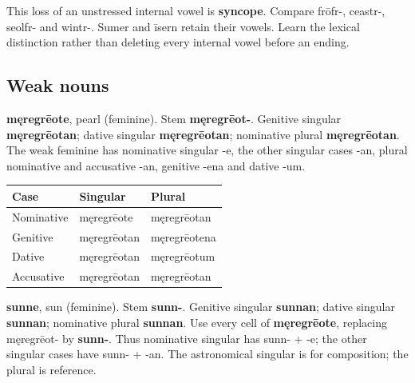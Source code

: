 This loss of an unstressed internal vowel is \textbf{syncope}. Compare frōfr-, ceastr-, seolfr- and wintr-. Sumer and īsern retain their vowels. Learn the lexical distinction rather than deleting every internal vowel before an ending.

\subsection*{Weak nouns}

\textbf{męregrēote}, pearl (feminine). Stem \textbf{męregrēot-}. Genitive singular \textbf{męregrēotan}; dative singular \textbf{męregrēotan}; nominative plural \textbf{męregrēotan}. The weak feminine has nominative singular -e, the other singular cases -an, plural nominative and accusative -an, genitive -ena and dative -um.

\par\begingroup
\fontsize{10.5}{13.2}\selectfont
\setlength{\LTleft}{0pt}\setlength{\LTright}{\fill}
\noindent
\begin{tabular}{@{}>{\raggedright\arraybackslash}p{35.87mm}>{\raggedright\arraybackslash}p{39.46mm}>{\raggedright\arraybackslash}p{43.05mm}@{}}
\toprule
\textbf{Case} & \textbf{Singular} & \textbf{Plural} \\
\midrule
Nominative & męregrēote & męregrēotan \\
Genitive & męregrēotan & męregrēotena \\
Dative & męregrēotan & męregrēotum \\
Accusative & męregrēotan & męregrēotan \\
\bottomrule
\end{tabular}
\par\endgroup

\textbf{sunne}, sun (feminine). Stem \textbf{sunn-}. Genitive singular \textbf{sunnan}; dative singular \textbf{sunnan}; nominative plural \textbf{sunnan}. Use every cell of \textbf{męregrēote}, replacing męregrēot- by \textbf{sunn-}. Thus nominative singular has sunn- + -e; the other singular cases have sunn- + -an. The astronomical singular is for composition; the plural is reference.

